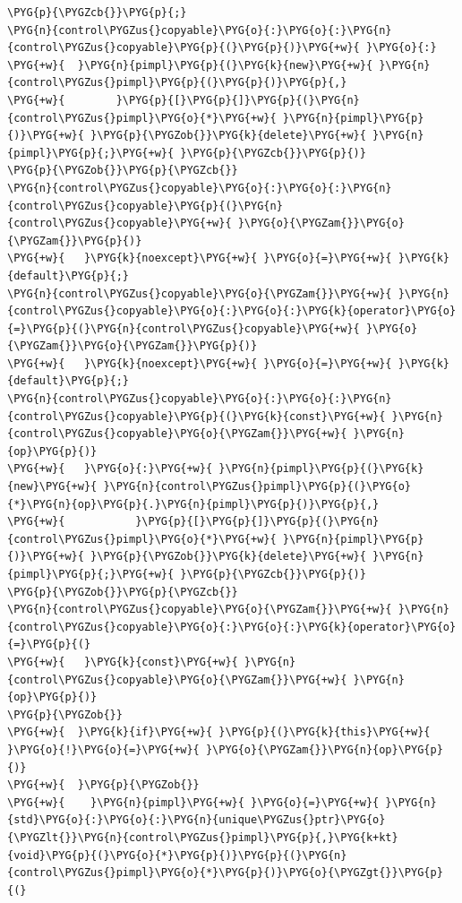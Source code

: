 \begin{codeblockbg}
\begin{Verbatim}[commandchars=\\\{\},breaklines=true,breakanywhere=true,fontsize=\codefont,xleftmargin=17bp]
\PYG{p}{\PYGZcb{}}\PYG{p}{;}
\PYG{n}{control\PYGZus{}copyable}\PYG{o}{:}\PYG{o}{:}\PYG{n}{control\PYGZus{}copyable}\PYG{p}{(}\PYG{p}{)}\PYG{+w}{ }\PYG{o}{:}
\PYG{+w}{  }\PYG{n}{pimpl}\PYG{p}{(}\PYG{k}{new}\PYG{+w}{ }\PYG{n}{control\PYGZus{}pimpl}\PYG{p}{(}\PYG{p}{)}\PYG{p}{,}
\PYG{+w}{        }\PYG{p}{[}\PYG{p}{]}\PYG{p}{(}\PYG{n}{control\PYGZus{}pimpl}\PYG{o}{*}\PYG{+w}{ }\PYG{n}{pimpl}\PYG{p}{)}\PYG{+w}{ }\PYG{p}{\PYGZob{}}\PYG{k}{delete}\PYG{+w}{ }\PYG{n}{pimpl}\PYG{p}{;}\PYG{+w}{ }\PYG{p}{\PYGZcb{}}\PYG{p}{)}
\PYG{p}{\PYGZob{}}\PYG{p}{\PYGZcb{}}
\PYG{n}{control\PYGZus{}copyable}\PYG{o}{:}\PYG{o}{:}\PYG{n}{control\PYGZus{}copyable}\PYG{p}{(}\PYG{n}{control\PYGZus{}copyable}\PYG{+w}{ }\PYG{o}{\PYGZam{}}\PYG{o}{\PYGZam{}}\PYG{p}{)}
\PYG{+w}{   }\PYG{k}{noexcept}\PYG{+w}{ }\PYG{o}{=}\PYG{+w}{ }\PYG{k}{default}\PYG{p}{;}
\PYG{n}{control\PYGZus{}copyable}\PYG{o}{\PYGZam{}}\PYG{+w}{ }\PYG{n}{control\PYGZus{}copyable}\PYG{o}{:}\PYG{o}{:}\PYG{k}{operator}\PYG{o}{=}\PYG{p}{(}\PYG{n}{control\PYGZus{}copyable}\PYG{+w}{ }\PYG{o}{\PYGZam{}}\PYG{o}{\PYGZam{}}\PYG{p}{)}
\PYG{+w}{   }\PYG{k}{noexcept}\PYG{+w}{ }\PYG{o}{=}\PYG{+w}{ }\PYG{k}{default}\PYG{p}{;}
\PYG{n}{control\PYGZus{}copyable}\PYG{o}{:}\PYG{o}{:}\PYG{n}{control\PYGZus{}copyable}\PYG{p}{(}\PYG{k}{const}\PYG{+w}{ }\PYG{n}{control\PYGZus{}copyable}\PYG{o}{\PYGZam{}}\PYG{+w}{ }\PYG{n}{op}\PYG{p}{)}
\PYG{+w}{   }\PYG{o}{:}\PYG{+w}{ }\PYG{n}{pimpl}\PYG{p}{(}\PYG{k}{new}\PYG{+w}{ }\PYG{n}{control\PYGZus{}pimpl}\PYG{p}{(}\PYG{o}{*}\PYG{n}{op}\PYG{p}{.}\PYG{n}{pimpl}\PYG{p}{)}\PYG{p}{,}
\PYG{+w}{           }\PYG{p}{[}\PYG{p}{]}\PYG{p}{(}\PYG{n}{control\PYGZus{}pimpl}\PYG{o}{*}\PYG{+w}{ }\PYG{n}{pimpl}\PYG{p}{)}\PYG{+w}{ }\PYG{p}{\PYGZob{}}\PYG{k}{delete}\PYG{+w}{ }\PYG{n}{pimpl}\PYG{p}{;}\PYG{+w}{ }\PYG{p}{\PYGZcb{}}\PYG{p}{)}
\PYG{p}{\PYGZob{}}\PYG{p}{\PYGZcb{}}
\PYG{n}{control\PYGZus{}copyable}\PYG{o}{\PYGZam{}}\PYG{+w}{ }\PYG{n}{control\PYGZus{}copyable}\PYG{o}{:}\PYG{o}{:}\PYG{k}{operator}\PYG{o}{=}\PYG{p}{(}
\PYG{+w}{   }\PYG{k}{const}\PYG{+w}{ }\PYG{n}{control\PYGZus{}copyable}\PYG{o}{\PYGZam{}}\PYG{+w}{ }\PYG{n}{op}\PYG{p}{)}
\PYG{p}{\PYGZob{}}
\PYG{+w}{  }\PYG{k}{if}\PYG{+w}{ }\PYG{p}{(}\PYG{k}{this}\PYG{+w}{ }\PYG{o}{!}\PYG{o}{=}\PYG{+w}{ }\PYG{o}{\PYGZam{}}\PYG{n}{op}\PYG{p}{)}
\PYG{+w}{  }\PYG{p}{\PYGZob{}}
\PYG{+w}{    }\PYG{n}{pimpl}\PYG{+w}{ }\PYG{o}{=}\PYG{+w}{ }\PYG{n}{std}\PYG{o}{:}\PYG{o}{:}\PYG{n}{unique\PYGZus{}ptr}\PYG{o}{\PYGZlt{}}\PYG{n}{control\PYGZus{}pimpl}\PYG{p}{,}\PYG{k+kt}{void}\PYG{p}{(}\PYG{o}{*}\PYG{p}{)}\PYG{p}{(}\PYG{n}{control\PYGZus{}pimpl}\PYG{o}{*}\PYG{p}{)}\PYG{o}{\PYGZgt{}}\PYG{p}{(}

\end{Verbatim}
\end{codeblockbg}
